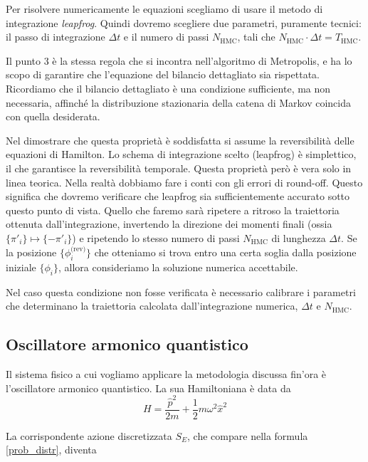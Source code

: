 \documentclass[11pt, a4paper]{article}
\begin{document}
Per risolvere numericamente le equazioni scegliamo di usare il metodo di integrazione \emph{leapfrog}.
Quindi dovremo scegliere due parametri, puramente tecnici: il passo di integrazione $\Delta t$ e il numero di passi $N_{\text{HMC}}$, tali che $N_{\text{HMC}} \cdot \Delta t = T_\text{HMC}$.

Il punto 3 è la stessa regola che si incontra nell'algoritmo di Metropolis, e ha lo scopo di garantire che l'equazione del bilancio dettagliato sia rispettata.
Ricordiamo che il bilancio dettagliato è una condizione sufficiente, ma non necessaria, affinché la distribuzione stazionaria della catena di Markov coincida con quella desiderata.

Nel dimostrare che questa proprietà è soddisfatta si assume la reversibilità delle equazioni di Hamilton.
Lo schema di integrazione scelto (leapfrog) è simplettico, il che garantisce la reversibilità temporale.
Questa proprietà però è vera solo in linea teorica. Nella realtà dobbiamo fare i conti con gli errori di round-off. Questo significa che dovremo verificare che leapfrog sia sufficientemente accurato sotto questo punto di vista.
Quello che faremo sarà ripetere a ritroso la traiettoria ottenuta dall'integrazione, invertendo la direzione dei momenti finali (ossia $\{\pi'_i\} \mapsto \{-\pi'_i\}$) e ripetendo lo stesso numero di passi $N_{\text{HMC}}$ di lunghezza $\Delta t$.
Se la posizione $\{\phi^{\text{(rev)}}_i\}$ che otteniamo si trova entro una certa soglia dalla posizione iniziale $\{\phi_i\}$, allora consideriamo la soluzione numerica accettabile.

Nel caso questa condizione non fosse verificata è necessario calibrare i parametri che determinano la traiettoria calcolata dall'integrazione numerica, $\Delta t$ e $N_{\text{HMC}}$.

\subsection{Oscillatore armonico quantistico}

Il sistema fisico a cui vogliamo applicare la metodologia discussa fin'ora è l'oscillatore armonico quantistico. La sua Hamiltoniana è data da
\begin{equation}
  H = \frac{\hat{p}^2}{2m} + \frac{1}{2} m \omega^2 \hat{x}^2
\end{equation}

La corrispondente azione discretizzata $S_E$, che compare nella formula \eqref{prob_distr}, diventa
\end{document}
